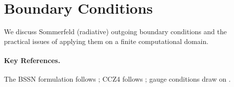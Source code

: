 \section{Boundary Conditions}
\label{sec:bssn-boundary}

We discuss Sommerfeld (radiative) outgoing boundary conditions and the practical
issues of applying them on a finite computational domain.

\paragraph{Key References.}
The BSSN formulation follows \cite{Shibata1995,Baumgarte1999}; CCZ4 follows
\cite{Alic2012}; gauge conditions draw on \cite{Bona1995,Alcubierre2003}.
